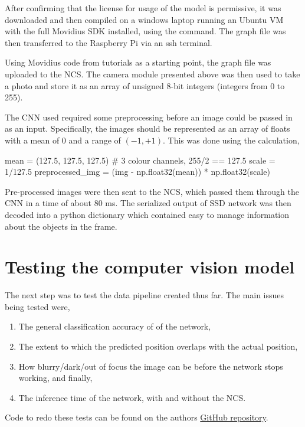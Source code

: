After confirming that the license for usage of the model is permissive, it was downloaded and then compiled on a windows laptop running an Ubuntu VM with the full Movidius SDK installed, using the  command. The graph file was then transferred to the Raspberry Pi via an ssh terminal.

Using Movidius code from tutorials as a starting point, the graph file was uploaded to the NCS. The camera module presented above was then used to take a photo and store it as an array of unsigned 8-bit integers (integers from 0 to 255).

The CNN used required some preprocessing before an image could be passed in as an input. Specifically, the images should be represented as an array of floats with a mean of 0 and a range of $(-1, +1)$. This was done using the calculation,%

\begin{python}
mean = (127.5, 127.5, 127.5)  # 3 colour channels, 255/2 == 127.5
scale = 1/127.5
preprocessed_img = (img - np.float32(mean)) * np.float32(scale)
\end{python}

Pre-processed images were then sent to the NCS, which passed them through the CNN in a time of about 80 ms. The serialized output of SSD network was then decoded into a python dictionary which contained easy to manage information about the objects in the frame.

\section{Testing the computer vision model}
The next step was to test the data pipeline created thus far. The main issues being tested were,

\begin{enumerate}
\item The general classification accuracy of of the network,
\item The extent to which the predicted position overlaps with the actual position,
\item How blurry/dark/out of focus the image can be before the network stops working, and finally,
\item The inference time of the network, with and without the NCS.
\end{enumerate}

Code to redo these tests can be found on the authors \href{https://github.com/alknemeyer/EEE4022S-Thesis-Project/blob/master/Final%20code/tests.ipynb}{GitHub repository}.


